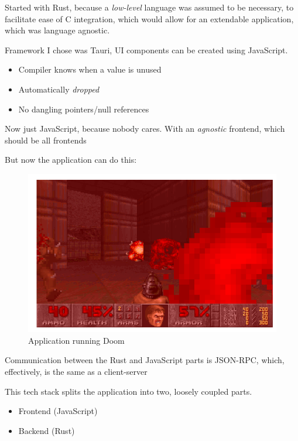 Started with Rust, because a \textit{low-level} language was assumed to be
necessary, to facilitate ease of C integration, which would allow for an
extendable application, which was language agnostic.

Framework I chose was Tauri, UI components can be created using JavaScript.

\begin{itemize}
  \item Compiler knows when a value is unused
  \item Automatically \textit{dropped}
  \item No dangling pointers/null references
\end{itemize}

Now just JavaScript, because nobody cares. With an \textit{agnostic} frontend,
which should be all frontends

But now the application can do this:

\begin{figure}
  \centering
  \includegraphics[scale=0.5]{./pics/doom}
  \caption{Application running Doom}
\end{figure}

Communication between the Rust and JavaScript parts is JSON-RPC, which,
effectively, is the same as a client-server

This tech stack splits the application into two, loosely coupled parts.
\begin{itemize}
  \item Frontend (JavaScript)
  \item Backend (Rust)
\end{itemize}

